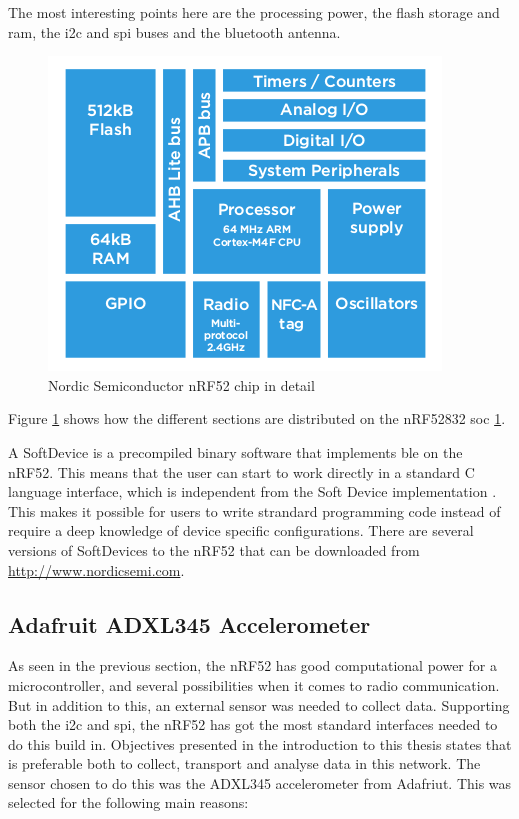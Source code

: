 The most interesting points here are the processing power, the flash storage and \gls{ram}, the \gls{i2c} and \gls{spi} buses and the bluetooth antenna. 



\begin{figure}[ht]
    \centering
    \includegraphics[scale=0.6]{nrf52Detailed.png}    
    \caption{Nordic Semiconductor nRF52 chip in detail }
    \label{fig:nrf52chipDetail}
\end{figure} 

Figure \ref{fig:nrf52chipDetail} shows how the different sections are distributed on the nRF52832 \gls{soc} \ref{fig:nrf52chipDetail}.  

A SoftDevice is a precompiled binary software that implements \gls{ble} on the nRF52. This means that the user can start to work directly in a standard C language interface, which is independent from the Soft Device implementation \cite{softDevice}. This makes it possible for users to write strandard programming code instead of require a deep knowledge of device specific configurations. There are several versions of SoftDevices to the nRF52 that can be downloaded from \url{http://www.nordicsemi.com}. 


\subsection{Adafruit ADXL345 Accelerometer}

As seen in the previous section, the nRF52 has good computational power for a \gls{microcontroller}, and several possibilities when it comes to radio communication. But in addition to this, an external sensor was needed to collect data. Supporting both the \gls{i2c} and \gls{spi}, the nRF52 has got the most standard interfaces needed to do this build in. Objectives presented in the introduction to this thesis states that is preferable both to collect, transport and analyse data in this network. The sensor chosen to do this was the ADXL345 accelerometer from Adafriut. This was selected for the following main reasons:  

